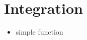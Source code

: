 \section{Integration}\label{sec:integration}

\begin{itemize}
    \item simple function
\end{itemize}